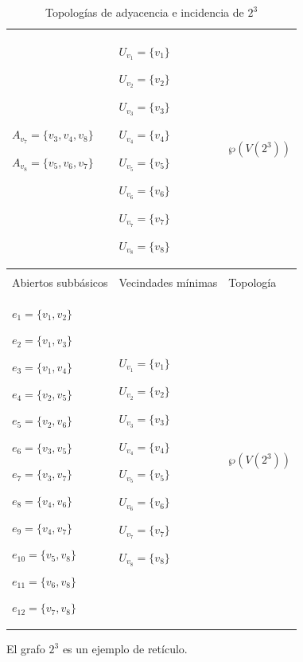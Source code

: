 \begin{table}[p]
\begin{tabular}{@{}>{\centering\arraybackslash}m{}>{\centering\arraybackslash}m{}>{\centering\arraybackslash}m{}@{}}
         ${A_{v_7}=\{v_3,v_4,v_8\}}$\par
         ${A_{v_8}=\{v_5,v_6,v_7\}}$
      &
         ${U_{v_1}=\{v_1\}}$\par
         ${U_{v_2}=\{v_2\}}$\par
         ${U_{v_3}=\{v_3\}}$\par
         ${U_{v_4}=\{v_4\}}$\par
         ${U_{v_5}=\{v_5\}}$\par
         ${U_{v_6}=\{v_6\}}$\par
         ${U_{v_7}=\{v_7\}}$\par
         ${U_{v_8}=\{v_8\}}$
      &
         $\wp\left(V\left(2^3\right)\right)$ \\[6pt]
      \hline
      \multicolumn{3}{c}{\textbf{Topología de incidencia}} \\
      \hline
      Abiertos subbásicos & Vecindades mínimas & Topología \\
      \hline
         ${e_{1}=\{v_1,v_2\}}$\par
         ${e_{2}=\{v_1,v_3\}}$\par
         ${e_{3}=\{v_1,v_4\}}$\par
         ${e_{4}=\{v_2,v_5\}}$\par
         ${e_{5}=\{v_2,v_6\}}$\par
         ${e_{6}=\{v_3,v_5\}}$\par
         ${e_{7}=\{v_3,v_7\}}$\par
         ${e_{8}=\{v_4,v_6\}}$\par
         ${e_{9}=\{v_4,v_7\}}$\par
         ${e_{10}=\{v_5,v_8\}}$\par
         ${e_{11}=\{v_6,v_8\}}$\par
         ${e_{12}=\{v_7,v_8\}}$
      &
         ${U_{v_1}=\{v_1\}}$\par
         ${U_{v_2}=\{v_2\}}$\par
         ${U_{v_3}=\{v_3\}}$\par
         ${U_{v_4}=\{v_4\}}$\par
         ${U_{v_5}=\{v_5\}}$\par
         ${U_{v_6}=\{v_6\}}$\par
         ${U_{v_7}=\{v_7\}}$\par
         ${U_{v_8}=\{v_8\}}$
      &
         $\wp\left(V\left(2^3\right)\right)$ \\[6pt]
      \hline
   \end{tabular}
   \caption{Topologías de adyacencia e incidencia de $2^3$}
   \label{tab:topologias_2_3}

   \vspace{2em}
   \begin{minipage}{\textwidth}
      \normalsize
      El grafo $2^3$ es un ejemplo de retículo.
   \end{minipage}
\end{table}
